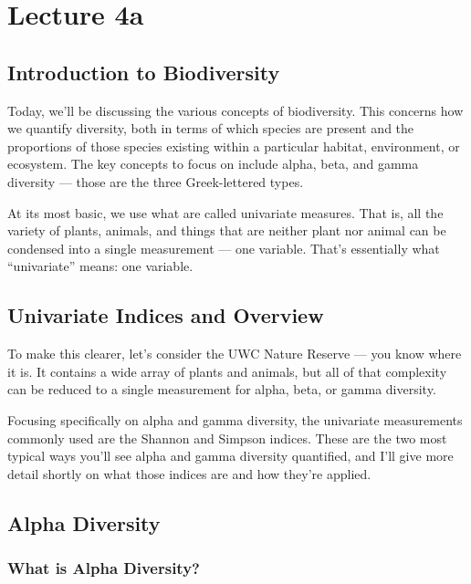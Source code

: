 \documentclass[
  12pt,
]{book}
\begin{document}
\chapter*{Lecture 4a}\label{lecture-4a}

\section{Introduction to
Biodiversity}\label{introduction-to-biodiversity}

Today, we'll be discussing the various concepts of biodiversity. This
concerns how we quantify diversity, both in terms of which species are
present and the proportions of those species existing within a
particular habitat, environment, or ecosystem. The key concepts to focus
on include alpha, beta, and gamma diversity --- those are the three
Greek-lettered types.

At its most basic, we use what are called univariate measures. That is,
all the variety of plants, animals, and things that are neither plant
nor animal can be condensed into a single measurement --- one variable.
That's essentially what ``univariate'' means: one variable.

\section{Univariate Indices and
Overview}\label{univariate-indices-and-overview}

To make this clearer, let's consider the UWC Nature Reserve --- you know
where it is. It contains a wide array of plants and animals, but all of
that complexity can be reduced to a single measurement for alpha, beta,
or gamma diversity.

Focusing specifically on alpha and gamma diversity, the univariate
measurements commonly used are the Shannon and Simpson indices. These
are the two most typical ways you'll see alpha and gamma diversity
quantified, and I'll give more detail shortly on what those indices are
and how they're applied.

\section{Alpha Diversity}\label{alpha-diversity}

\subsection{What is Alpha Diversity?}\label{what-is-alpha-diversity}
\end{document}

